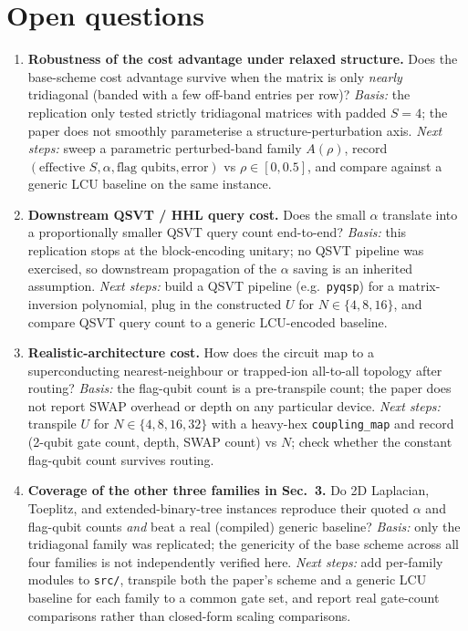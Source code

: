 \section{Open questions}

\begin{enumerate}
  \item \textbf{Robustness of the cost advantage under relaxed
        structure.} Does the base-scheme cost advantage survive when
        the matrix is only \emph{nearly} tridiagonal (banded with a
        few off-band entries per row)?
        \emph{Basis:} the replication only tested strictly tridiagonal
        matrices with padded $S=4$; the paper does not smoothly
        parameterise a structure-perturbation axis.
        \emph{Next steps:} sweep a parametric perturbed-band family
        $A(\rho)$, record $(\text{effective } S, \alpha, \text{flag
        qubits}, \text{error})$ vs $\rho \in [0, 0.5]$, and compare
        against a generic LCU baseline on the same instance.

  \item \textbf{Downstream QSVT / HHL query cost.} Does the small
        $\alpha$ translate into a proportionally smaller QSVT query
        count end-to-end?
        \emph{Basis:} this replication stops at the block-encoding
        unitary; no QSVT pipeline was exercised, so downstream
        propagation of the $\alpha$ saving is an inherited assumption.
        \emph{Next steps:} build a QSVT pipeline (e.g.\ \texttt{pyqsp})
        for a matrix-inversion polynomial, plug in the constructed
        $U$ for $N \in \{4,8,16\}$, and compare QSVT query count to a
        generic LCU-encoded baseline.

  \item \textbf{Realistic-architecture cost.} How does the circuit
        map to a superconducting nearest-neighbour or trapped-ion
        all-to-all topology after routing?
        \emph{Basis:} the flag-qubit count is a pre-transpile count;
        the paper does not report SWAP overhead or depth on any
        particular device.
        \emph{Next steps:} transpile $U$ for $N \in \{4,8,16,32\}$
        with a heavy-hex \texttt{coupling\_map} and record
        (2-qubit gate count, depth, SWAP count) vs $N$; check whether
        the constant flag-qubit count survives routing.

  \item \textbf{Coverage of the other three families in Sec.~3.}
        Do 2D Laplacian, Toeplitz, and extended-binary-tree instances
        reproduce their quoted $\alpha$ and flag-qubit counts \emph{and}
        beat a real (compiled) generic baseline?
        \emph{Basis:} only the tridiagonal family was replicated; the
        genericity of the base scheme across all four families is not
        independently verified here.
        \emph{Next steps:} add per-family modules to
        \texttt{src/}, transpile both the paper's scheme and a
        generic LCU baseline for each family to a common gate set,
        and report real gate-count comparisons rather than closed-form
        scaling comparisons.


\end{enumerate}
